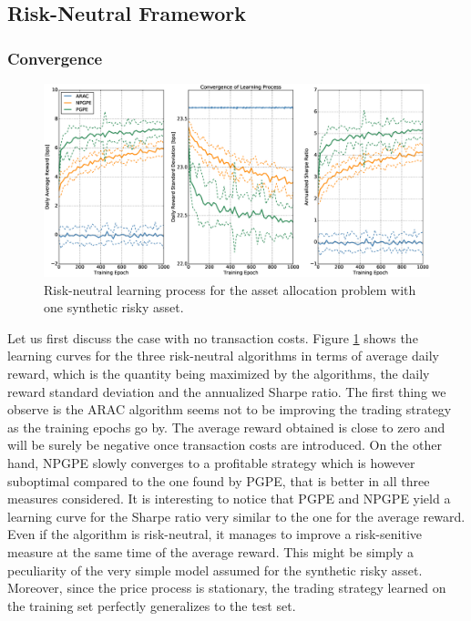 \subsection{Risk-Neutral Framework}
\subsubsection{Convergence}
\begin{figure}[t!]
	\centering
	\includegraphics[width=1.0\textwidth]{Images/6_0_single_synthetic_neutral_convergence}
	\caption[Risk-neutral learning process for one synthetic risky asset]{Risk-neutral learning process for the asset allocation problem with one synthetic risky asset.}
	\label{fig:single_synthetic_neutral_convergence}
\end{figure}
Let us first discuss the case with no transaction costs. Figure \ref{fig:single_synthetic_neutral_convergence} shows the learning curves for the three risk-neutral algorithms in terms of average daily reward, which is the quantity being maximized by the algorithms, the daily reward standard deviation and the annualized Sharpe ratio. The first thing we observe is the ARAC algorithm seems not to be improving the trading strategy as the training epochs go by. The average reward obtained is close to zero and will be surely be negative once transaction costs are introduced. On the other hand, NPGPE slowly converges to a profitable strategy which is however suboptimal compared to the one found by PGPE, that is better in all three measures considered. It is interesting to notice that PGPE and NPGPE yield a learning curve for the Sharpe ratio very similar to the one for the average reward. Even if the algorithm is risk-neutral, it manages to improve a risk-senitive measure at the same time of the average reward. This might be simply a peculiarity of the very simple model assumed for the synthetic risky asset. Moreover, since the price process is stationary, the trading strategy learned on the training set perfectly generalizes to the test set. 

